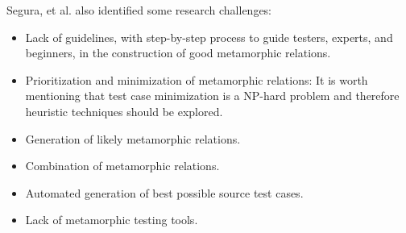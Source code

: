 Segura, et al. \cite{Segura2016} also identified some research challenges:
\begin{itemize}
	\item Lack of guidelines, with step-by-step process to guide testers, experts, and beginners, in the construction of good metamorphic relations.
	\item Prioritization and minimization of metamorphic relations: It is worth mentioning that test case minimization is a NP-hard problem and therefore heuristic techniques should be explored.
	\item Generation of likely metamorphic relations.
	\item Combination of metamorphic relations.
	\item Automated generation of best possible source test cases.
	\item Lack of metamorphic testing tools.
\end{itemize}
